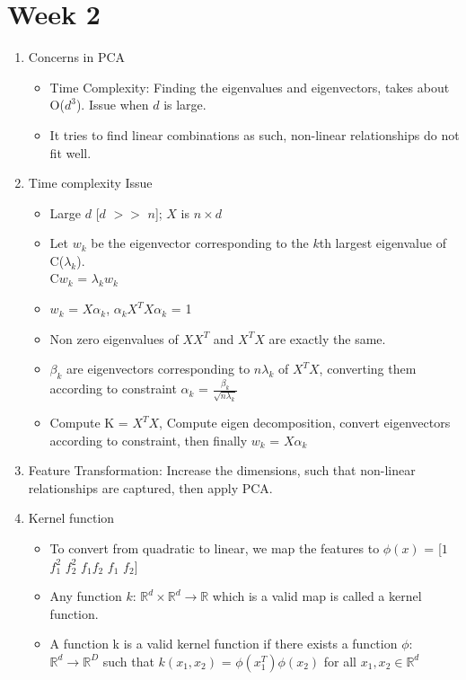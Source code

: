 \documentclass[a4paper]{article}
\begin{document}
\section{Week 2}
\begin{enumerate}
    \item Concerns in PCA
    \begin{itemize}
        \item Time Complexity: Finding the eigenvalues and eigenvectors, takes about O($d^3$). Issue when $d$ is large.
        \item It tries to find linear combinations as such, non-linear relationships do not fit well.
    \end{itemize}
    \item Time complexity Issue
    \begin{itemize}
        \item Large $d$ [$d$ $>>$ $n$]; $X$ is $n\times d$
        \item Let $w_k$ be the eigenvector corresponding to the $k$th largest eigenvalue of C($\lambda_k$).\\
        C$w_k$ = $\lambda_kw_k$
        \item $w_k$ = $X\alpha_k$, $\alpha_kX^TX\alpha_k$ = 1
        \item Non zero eigenvalues of $XX^T$ and $X^TX$ are exactly the same.
        \item $\beta_k$ are eigenvectors corresponding to $n\lambda_k$ of $X^TX$, converting them according to constraint $\alpha_k$ = $\frac{\beta_k}{\sqrt{n\lambda_k}}$
        \item Compute K = $X^TX$, Compute eigen decomposition, convert eigenvectors according to constraint, then finally $w_k$ = $X\alpha_k$
    \end{itemize}
    \item Feature Transformation: Increase the dimensions, such that non-linear relationships are captured, then apply PCA.
    \item Kernel function
    \begin{itemize}
        \item To convert from quadratic to linear, we map the features to $\phi(x)$ = [$1$ $f_1^2$ $f_2^2$ $f_1f_2$ $f_1$ $f_2$]
        \item Any function $k$: $\mathbb{R}^d\times\mathbb{R}^d\rightarrow \mathbb{R}$ which is a valid map is called a kernel function.
        \item A function k is a valid kernel function if there exists a function $\phi:$ $\mathbb{R}^d\rightarrow \mathbb{R}^D$ such that $k(x_1,x_2)$ = $\phi(x_1^T)\phi(x_2)$ for all $x_1,x_2\in \mathbb{R}^d$

\end{itemize}
\end{enumerate}
\end{document}
